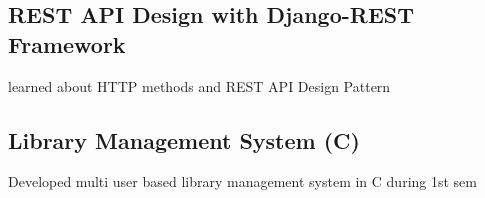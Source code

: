\documentclass[a4paper,11pt]{article}
\begin{document}
\begin{minipage}[t]{0.6\textwidth}
    \subsection*{REST API Design with Django-REST Framework}
    {learned about HTTP methods and REST API Design Pattern}
    \subsection*{Library Management System (C)}
    {Developed multi user based library management system in C during 1st sem}
    
    
\end{minipage}
\newpage
    
\end{document}
